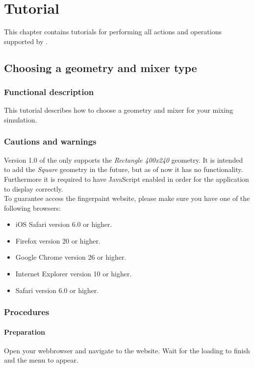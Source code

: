 \chapter{Tutorial}
This chapter contains tutorials for performing all actions and operations supported by \projectname.

\section{Choosing a geometry and mixer type}
\label{sec:ChooseGeomAndMixer}

\subsection{Functional description}
This tutorial describes how to choose a geometry and mixer for your mixing simulation.

\subsection{Cautions and warnings}

Version 1.0 of the \applicationname{} only supports the \emph{Rectangle 400x240} geometry. It is intended to add the \emph{Square} geometry in the future, but as of now it has no functionality. Furthermore it is required to have JavaScript enabled in order for the application to display correctly.\\

\noindent To guarantee access the fingerpaint website, please make sure you have one of the following browsers:\\
\begin{itemize}
\item iOS Safari version 6.0 or higher.
\item Firefox version 20 or higher.
\item Google Chrome version 26 or higher.
\item Internet Explorer version 10 or higher.
\item Safari version 6.0 or higher.
\end{itemize}

\subsection{Procedures}

\subsubsection{Preparation}
Open your webbrowser and navigate to the \projectname{} website. Wait for the loading to finish and the menu to appear.

